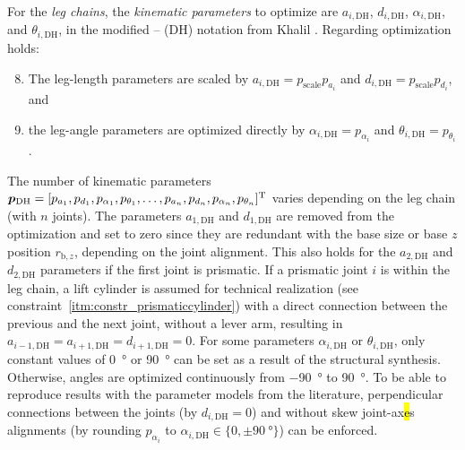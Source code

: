 For the \emph{leg chains}, the \emph{kinematic parameters} to optimize are $a_{i,\mathrm{DH}}$, $d_{i,\mathrm{DH}}$, $\alpha_{i,\mathrm{DH}}$, and $\theta_{i,\mathrm{DH}}$, in the modified -- (DH) notation from Khalil \cite{KhalilDom2002}. %
Regarding optimization holds:
\begin{enumerate}
\setcounter{enumi}{7}
\item \label{itm:param_leglength} The leg-length parameters are scaled  by $a_{i,\mathrm{DH}}=p_\mathrm{scale} p_{a_i}$ and $d_{i,\mathrm{DH}}=p_\mathrm{scale} p_{d_i}$, and  %
\item \label{itm:param_legangle} the leg-angle parameters are optimized directly by $\alpha_{i,\mathrm{DH}}=p_{\alpha_i}$ and $\theta_{i,\mathrm{DH}}=p_{\theta_i}$.
\end{enumerate}
%
The %
%
number of kinematic parameters $\bm{p}_\mathrm{DH}=[p_{a_1},p_{d_1},p_{\alpha_1},p_{\theta_1},\dots,p_{a_n},p_{d_n},p_{\alpha_n},p_{\theta_n}]^{\mathrm{T}}$ varies depending on the leg chain (with $n$ joints). %
%
The parameters $a_{1,\mathrm{DH}}$ and $d_{1,\mathrm{DH}}$ are removed from the optimization and set to zero since they are redundant with the base size or base $z$ position $r_{\mathrm{b},z}$, depending on the joint alignment.
This also holds for the $a_{2,\mathrm{DH}}$ and $d_{2,\mathrm{DH}}$ parameters if the first joint is prismatic.
If a prismatic joint $i$ is within the leg chain, a lift cylinder is assumed for technical realization (see constraint~\ref*{itm:constr_prismaticcylinder}) with a direct connection between the previous and the next joint, without a lever arm, resulting in $a_{i-1,\mathrm{DH}}=a_{i+1,\mathrm{DH}}=d_{i+1,\mathrm{DH}}=0$. %
%
For some parameters $\alpha_{i,\mathrm{DH}}$ or $\theta_{i,\mathrm{DH}}$, only constant values of \SI{0}{\degree} or \SI{90}{\degree} can be set as a result of the structural synthesis. %
Otherwise, angles are optimized continuously from \SI{-90}{\degree} to \SI{+90}{\degree}.
To be able to reproduce results with the parameter models from the literature, perpendicular connections between the joints (by $d_{i,\mathrm{DH}}=0$) and without skew joint-ax\hl{e}s alignments (by rounding $p_{\alpha_i}$ to  $\alpha_{i,\mathrm{DH}} \in \{0, \pm{}\SI{90}{\degree}\}$) can be enforced. %


